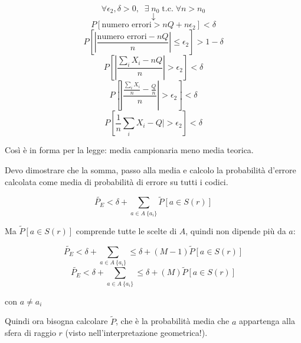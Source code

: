 \begin{equation*}
\forall \epsilon_2, \delta > 0, \; \; \exists \; n_0 \; \text{t.c.} \; \forall n > n_0 
\end{equation*}
\begin{equation*}
\downarrow
\end{equation*}
\begin{equation*}
P[\text{numero errori} > nQ+n\epsilon_2] < \delta
\end{equation*}
\begin{equation*}
P[|\frac{\text{numero errori} - nQ}{n}| \leq \epsilon_2] > 1 - \delta
\end{equation*}
\begin{equation*}
P[|\frac{\sum_iX_i - nQ}{n}| > \epsilon_2] < \delta
\end{equation*}
\begin{equation*}
P[|\frac{\frac{\sum_iX_i}{n} - \frac{Q}{n}}{n}| > \epsilon_2] < \delta
\end{equation*}
\begin{equation*}
P[\frac1n\sum_iX_i - Q| > \epsilon_2] < \delta
\end{equation*}

Così è in forma per la legge: media campionaria meno media teorica.

Devo dimostrare che la somma, passo alla media e calcolo la probabilità d'errore calcolata come media di probabilità di errore su tutti i codici.

\begin{equation*}
\tilde{P_E} < \delta + \sum_{a \in A \ \{a_i\}} \tilde{P}[a \in S(r)]
\end{equation*}

Ma $\tilde{P}[a \in S(r)]$ comprende tutte le scelte di $A$, quindi non dipende più da $a$:

\begin{equation*}
\tilde{P_E} < \delta + \sum_{a \in A \ \{a_i\}} \leq \delta + (M-1) \tilde{P}[a \in S(r)]
\end{equation*}
\begin{equation*}
\tilde{P_E} < \delta + \sum_{a \in A \ \{a_i\}} \leq \delta + (M) \tilde{P}[a \in S(r)]
\end{equation*}

\begin{center}
con $a \neq a_i$
\end{center}

Quindi ora bisogna calcolare $\tilde{P}$, che è la probabilità media che $a$ appartenga alla sfera di raggio $r$ (visto nell'interpretazione geometrica!).

